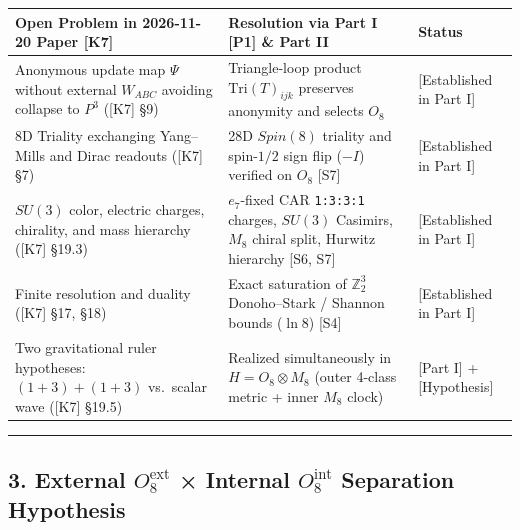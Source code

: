 \documentclass[
  a4paper,
]{article}
\newcounter{none} %
\begin{document}
{\def\LTcaptype{none} %
\begin{longtable}[]{@{}
  >{\raggedright\arraybackslash}p{}
  >{\raggedright\arraybackslash}p{}
  >{\raggedright\arraybackslash}p{}@{}}
\toprule\noalign{}
\begin{minipage}[b]{\linewidth}\raggedright
Open Problem in 2026-11-20 Paper {[}K7{]}
\end{minipage} & \begin{minipage}[b]{\linewidth}\raggedright
Resolution via Part I {[}P1{]} \& Part II
\end{minipage} & \begin{minipage}[b]{\linewidth}\raggedright
Status
\end{minipage} \\
\midrule\noalign{}
\endhead
\bottomrule\noalign{}
\endlastfoot
Anonymous update map \(\Psi\) without external \(W_{ABC}\) avoiding
collapse to \(P^3\) ({[}K7{]} §9) & Triangle-loop product
\(\mathrm{Tri}(T)_{ijk}\) preserves anonymity and selects \(O_8\) &
{[}Established in Part I{]} \\
8D Triality exchanging Yang--Mills and Dirac readouts ({[}K7{]} §7) &
28D \(Spin(8)\) triality and spin-\(1/2\) sign flip (\(-I\)) verified on
\(O_8\) {[}S7{]} & {[}Established in Part I{]} \\
\(SU(3)\) color, electric charges, chirality, and mass hierarchy
({[}K7{]} §19.3) & \(e_7\)-fixed CAR \texttt{1:3:3:1} charges, \(SU(3)\)
Casimirs, \(M_8\) chiral split, Hurwitz hierarchy {[}S6, S7{]} &
{[}Established in Part I{]} \\
Finite resolution and duality ({[}K7{]} §17, §18) & Exact saturation of
\(\mathbb{Z}_2^3\) Donoho--Stark / Shannon bounds (\(\ln 8\)) {[}S4{]} &
{[}Established in Part I{]} \\
Two gravitational ruler hypotheses: \((1+3)+(1+3)\) vs.~scalar wave
({[}K7{]} §19.5) & Realized simultaneously in \(H = O_8 \otimes M_8\)
(outer 4-class metric + inner \(M_8\) clock) & {[}Part I{]} +
{[}Hypothesis{]} \\
\end{longtable}
}

\begin{center}\rule{0.5\linewidth}{0.5pt}\end{center}

\subsection{\texorpdfstring{3. External \(O_8^{\mathrm{ext}}\) ×
Internal \(O_8^{\mathrm{int}}\) Separation
Hypothesis}{3. External O\_8\^{}\{\textbackslash mathrm\{ext\}\} × Internal O\_8\^{}\{\textbackslash mathrm\{int\}\} Separation Hypothesis}}\label{external-o_8mathrmext-internal-o_8mathrmint-separation-hypothesis}
\end{document}
